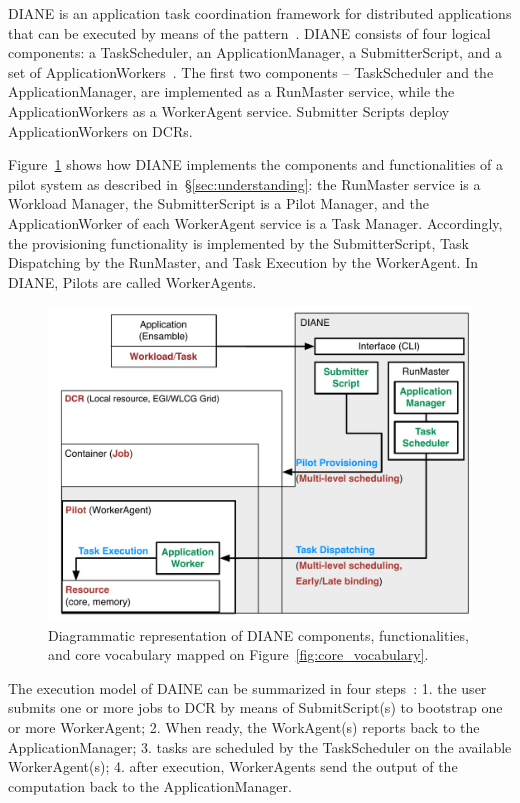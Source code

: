 \documentclass{sig-alternate}
\begin{document}
DIANE is an application task coordination framework for distributed applications
that can be executed by means of the \MW pattern~\cite{moscicki2003diane}. DIANE
consists of four logical components: a TaskScheduler, an ApplicationManager, a
SubmitterScript, and a set of ApplicationWorkers~\cite{diane_url}. The first two
components -- TaskScheduler and the ApplicationManager, are implemented as a
RunMaster service, while the ApplicationWorkers as a WorkerAgent service.
Submitter Scripts deploy ApplicationWorkers on DCRs.


Figure~\ref{fig:diane_comparison} shows how DIANE implements the components and
functionalities of a pilot system as described in~\S\ref{sec:understanding}: the
RunMaster service is a Workload Manager, the SubmitterScript is a Pilot Manager,
and the ApplicationWorker of each WorkerAgent service is a Task Manager.
Accordingly, the \pilot provisioning functionality is implemented by the
SubmitterScript, Task Dispatching by the RunMaster, and Task Execution by the
WorkerAgent. In DIANE, Pilots are called WorkerAgents.

\begin{figure}[t]
    \centering
        \includegraphics[width=.48\textwidth]{figures/diane_comparison.pdf}
    \caption{Diagrammatic representation of DIANE components, functionalities,
    and core vocabulary mapped on Figure~\ref{fig:core_vocabulary}.}
    \label{fig:diane_comparison}
\end{figure}

The execution model of DAINE can be summarized in four
steps~\cite{moscicki2011understanding}: 1. the user submits one or more jobs to
DCR by means of SubmitScript(s) to bootstrap one or more WorkerAgent; 2. When
ready, the WorkAgent(s) reports back to the ApplicationManager; 3. tasks are
scheduled by the TaskScheduler on the available WorkerAgent(s); 4. after
execution, WorkerAgents send the output of the computation back to the
ApplicationManager.
\end{document}
